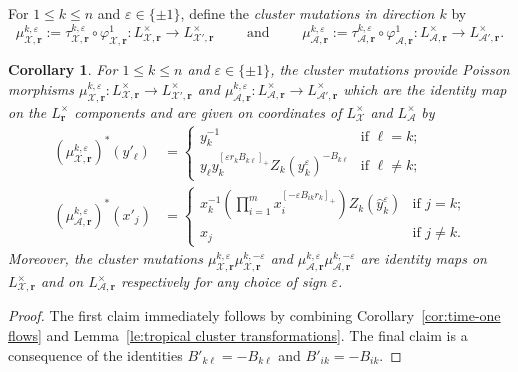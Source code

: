 \documentclass{amsart}
\newtheorem{corollary}[theorem]{Corollary}
\numberwithin{equation}{section}
\newcommand{\bfr}{{\boldsymbol{r}}}
\newcommand{\cA}{\mathcal{A}}
\newcommand{\cX}{\mathcal{X}}
\begin{document}
For $1\le k\le n$ and $\varepsilon\in\{\pm1\}$, define the \emph{cluster mutations in direction $k$} by 
\[\mu_{\cX,\bfr}^{k,\varepsilon}:=\tau_{\cX,\bfr}^{k,\varepsilon}\circ\varphi_{\cX,\bfr}^1:L^\times_{\cX,\bfr}\to L^\times_{\cX',\bfr}\qquad\text{ and }\qquad\mu_{\cA,\bfr}^{k,\varepsilon}:=\tau_{\cA,\bfr}^{k,\varepsilon}\circ\varphi_{\cA,\bfr}^1:L^\times_{\cA,\bfr}\to L^\times_{\cA',\bfr}.\]
\begin{corollary}
  \label{cor:cluster mutation}
  For $1\le k\le n$ and $\varepsilon\in\{\pm1\}$, the cluster mutations provide Poisson morphisms $\mu_{\cX,\bfr}^{k,\varepsilon}:L^\times_{\cX,\bfr}\to L^\times_{\cX',\bfr}$ and $\mu_{\cA,\bfr}^{k,\varepsilon}:L^\times_{\cA,\bfr}\to L^\times_{\cA',\bfr}$ which are the identity map on the $L^\times_\bfr$ components and are given on coordinates of $L^\times_\cX$ and $L^\times_\cA$ by
  \begin{align}
    \label{eq:X mutation}
    (\mu_{\cX,\bfr}^{k,\varepsilon})^*(y'_\ell)&=\begin{cases} y_k^{-1} & \text{if $\ell=k$;}\\ y_\ell y_k^{[\varepsilon r_kB_{k\ell}]_+} Z_k(y_k^\varepsilon)^{-B_{k\ell}} & \text{if $\ell\ne k$;}\end{cases}\\
    \label{eq:A mutation}
    (\mu_{\cA,\bfr}^{k,\varepsilon})^*(x'_j)&=\begin{cases} x_k^{-1}\left(\prod\limits_{i=1}^m x_i^{[-\varepsilon B_{ik}r_k]_+}\right)Z_k(\hat y_k^\varepsilon) & \text{if $j=k$;}\\ x_j & \text{if $j\ne k$.}\end{cases}
  \end{align}
  Moreover, the cluster mutations $\mu_{\cX,\bfr}^{k,\varepsilon}\mu_{\cX,\bfr}^{k,-\varepsilon}$ and $\mu_{\cA,\bfr}^{k,\varepsilon}\mu_{\cA,\bfr}^{k,-\varepsilon}$ are identity maps on $L^\times_{\cX,\bfr}$ and on $L^\times_{\cA,\bfr}$ respectively for any choice of sign $\varepsilon$.
\end{corollary}
\begin{proof}
  The first claim immediately follows by combining Corollary~\ref{cor:time-one flows} and Lemma~\ref{le:tropical cluster transformations}.
  The final claim is a consequence of the identities $B'_{k\ell}=-B_{k\ell}$ and $B'_{ik}=-B_{ik}$.
\end{proof}
\end{document}
